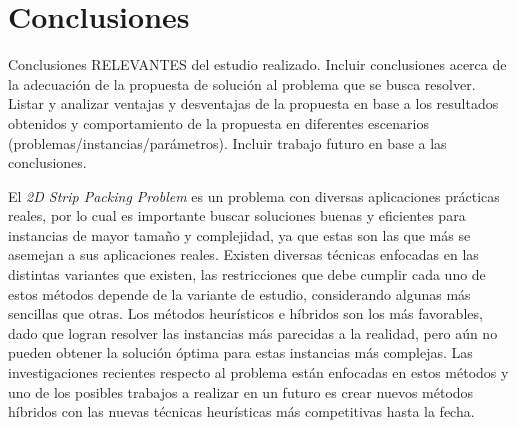 \documentclass[letter, 10pt]{article}
\begin{document}
\section{Conclusiones}

Conclusiones RELEVANTES del estudio realizado. Incluir conclusiones acerca de la adecuaci\'on de la propuesta de soluci\'on al problema que se busca resolver. Listar y analizar ventajas y desventajas de la propuesta en base a los resultados obtenidos y comportamiento de la propuesta en diferentes escenarios (problemas/instancias/par\'ametros). Incluir trabajo futuro en base a las conclusiones.
\vspace{0.2cm}

El \emph{2D Strip Packing Problem} es un problema con diversas aplicaciones pr\'acticas reales, por lo cual es importante buscar soluciones buenas y eficientes para instancias de mayor tama\~no y complejidad, ya que estas son las que m\'as se asemejan a sus aplicaciones reales. Existen diversas t\'ecnicas enfocadas en las distintas variantes que existen, las restricciones que debe cumplir cada uno de estos m\'etodos depende de la variante de estudio, considerando algunas m\'as sencillas que otras. Los m\'etodos heur\'isticos e h\'ibridos son los m\'as favorables, dado que logran resolver las instancias m\'as parecidas a la realidad, pero a\'un no pueden obtener la soluci\'on \'optima para estas instancias m\'as complejas. Las investigaciones recientes respecto al problema est\'an enfocadas en estos m\'etodos y uno de los posibles trabajos a realizar en un futuro es crear nuevos m\'etodos h\'ibridos con las nuevas t\'ecnicas heur\'isticas m\'as competitivas hasta la fecha. 



\end{document}
